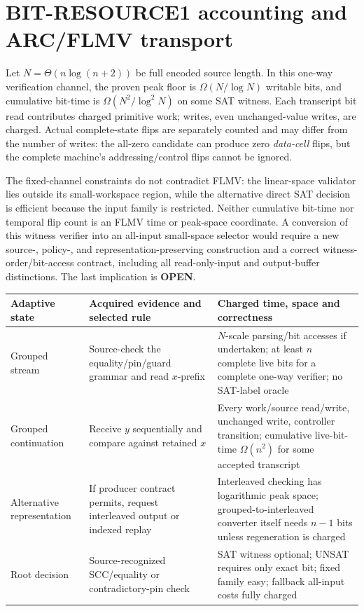 \documentclass[11pt]{article}
\newcommand{\OPEN}{\textbf{OPEN}}
\begin{document}
\section{BIT-RESOURCE1 accounting and ARC/FLMV transport}
Let $N=\Theta(n\log(n+2))$ be full encoded source length. In this one-way verification channel, the proven peak floor is $\Omega(N/\log N)$ writable bits, and cumulative bit-time is $\Omega(N^2/\log^2 N)$ on some SAT witness. Each transcript bit read contributes charged primitive work; writes, even unchanged-value writes, are charged. Actual complete-state flips are separately counted and may differ from the number of writes: the all-zero candidate can produce zero \emph{data-cell} flips, but the complete machine's addressing/control flips cannot be ignored.

The fixed-channel constraints do not contradict FLMV: the linear-space validator lies outside its small-workspace region, while the alternative direct SAT decision is efficient because the input family is restricted. Neither cumulative bit-time nor temporal flip count is an FLMV time or peak-space coordinate. A conversion of this witness verifier into an all-input small-space selector would require a new source-, policy-, and representation-preserving construction and a correct witness-order/bit-access contract, including all read-only-input and output-buffer distinctions. The last implication is \OPEN.

\begin{center}\small
\begin{tabular}{p{.18\linewidth}p{.30\linewidth}p{.41\linewidth}}
\toprule
Adaptive state & Acquired evidence and selected rule & Charged time, space and correctness\\\midrule
Grouped stream & Source-check the equality/pin/guard grammar and read $x$-prefix & $N$-scale parsing/bit accesses if undertaken; at least $n$ complete live bits for a complete one-way verifier; no SAT-label oracle\\
Grouped continuation & Receive $y$ sequentially and compare against retained $x$ & Every work/source read/write, unchanged write, controller transition; cumulative live-bit-time $\Omega(n^2)$ for some accepted transcript\\
Alternative representation & If producer contract permits, request interleaved output or indexed replay & Interleaved checking has logarithmic peak space; grouped-to-interleaved converter itself needs $n-1$ bits unless regeneration is charged\\
Root decision & Source-recognized SCC/equality or contradictory-pin check & SAT witness optional; UNSAT requires only exact bit; fixed family easy; fallback all-input costs fully charged\\
\bottomrule
\end{tabular}
\end{center}
\end{document}
